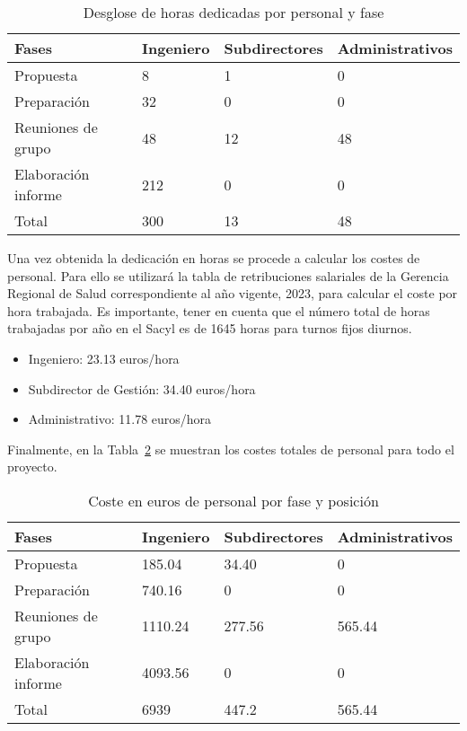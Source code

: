 \begin{table}
    \centering
    \begin{tabular}{llll}
        \toprule
        Fases               & Ingeniero & Subdirectores & Administrativos \\
        \midrule
        Propuesta           & 8         & 1             & 0               \\
        Preparación         & 32        & 0             & 0               \\
        Reuniones de grupo  & 48        & 12            & 48              \\
        Elaboración informe & 212       & 0             & 0               \\
        \midrule
        Total               & 300       & 13            & 48              \\
        \bottomrule
    \end{tabular}
    \caption{Desglose de horas dedicadas por personal y fase}
    \label{tab:horas-trabajadas}
\end{table}

Una vez obtenida la dedicación en horas se procede a calcular los costes de personal. Para ello se utilizará la tabla de retribuciones salariales de la Gerencia Regional de Salud correspondiente al año vigente, 2023, para calcular el coste por hora trabajada. Es importante, tener en cuenta que el número total de horas trabajadas por año en el Sacyl es de 1645 horas para turnos fijos diurnos.

\begin{itemize}
    \item Ingeniero: 23.13 euros/hora
    \item Subdirector de Gestión: 34.40 euros/hora
    \item Administrativo: 11.78 euros/hora
\end{itemize}

Finalmente, en la Tabla~\ref{tab:coste-horas} se muestran los costes totales de personal para todo el proyecto.

\begin{table}
    \centering
    \begin{tabular}{llll}
        \toprule
        Fases               & Ingeniero & Subdirectores & Administrativos \\
        \midrule
        Propuesta           & 185.04    & 34.40         & 0               \\
        Preparación         & 740.16    & 0             & 0               \\
        Reuniones de grupo  & 1110.24   & 277.56        & 565.44          \\
        Elaboración informe & 4093.56   & 0             & 0               \\
        \midrule
        Total               & 6939      & 447.2         & 565.44          \\
        \bottomrule
    \end{tabular}
    \caption{Coste en euros de personal por fase y posición}
    \label{tab:coste-horas}
\end{table}

